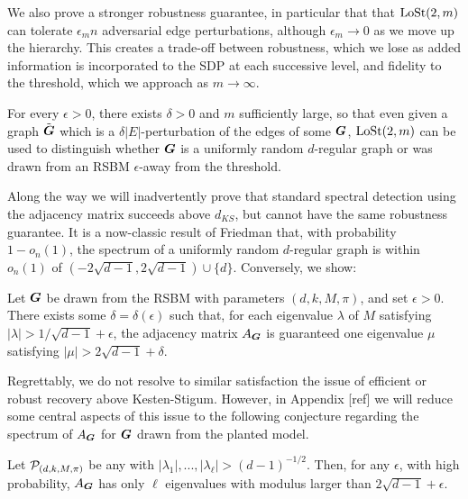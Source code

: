 We also prove a stronger robustness guarantee, in particular that that $\operatorname{LoSt}(2,m)$ can tolerate $\epsilon_m n$ adversarial edge perturbations, although $\epsilon_m \to 0$ as we move up the hierarchy. This creates a trade-off between robustness, which we lose as added information is incorporated to the SDP at each successive level, and fidelity to the threshold, which we approach as $m\to\infty$.

\begin{theorem} \label{thm:main-robust}
	For every $\epsilon > 0$, there exists $\delta > 0$ and $m$ sufficiently large, so that even given a graph $\tilde{\boldsymbol{G}}$ which is a $\delta|E|$-perturbation of the edges of some $\boldsymbol{G}$, $\operatorname{LoSt}(2,m)$ can be used to distinguish whether $\boldsymbol{G}$ is a uniformly random $d$-regular graph or was drawn from an RSBM $\epsilon$-away from the threshold.
\end{theorem}

Along the way we will inadvertently prove that standard spectral detection using the adjacency matrix succeeds above $d_{KS}$, but cannot have the same robustness guarantee. It is a now-classic result of Friedman that, with probability $1 - o_n(1)$, the spectrum of a uniformly random $d$-regular graph is within $o_n(1)$ of $(-2\sqrt{d-1},2\sqrt{d-1})\cup\{d\}$. Conversely, we show:

\begin{corollary} \label{corr:main-robust}
	Let $\boldsymbol{G}$ be drawn from the RSBM with parameters $(d,k,M,\pi)$, and set $\epsilon > 0$. There exists some $\delta = \delta(\epsilon)$ such that, for each eigenvalue $\lambda$ of $M$ satisfying $|\lambda| > 1/\sqrt{d-1} + \epsilon$, the adjacency matrix $A_{\boldsymbol{G}}$  is guaranteed one eigenvalue $\mu$ satisfying $|\mu| > 2\sqrt{d-1} + \delta$.
\end{corollary}

Regrettably, we do not resolve to similar satisfaction the issue of efficient or robust recovery above Kesten-Stigum. However, in Appendix [ref] we will reduce some central aspects of this issue to the following conjecture regarding the spectrum of $A_{\boldsymbol{G}}$ for $\boldsymbol{G}$ drawn from the planted model.

\begin{conjecture} \label{conj:planted-spec}
	Let $\mathcal{P}_{(d,k,M,\pi)}$ be any \model with $|\lambda_1|,...,|\lambda_\ell| > (d-1)^{-1/2}$. Then, for any $\epsilon$, with high probability, $A_{\boldsymbol{G}}$ has only $\ell$ eigenvalues with modulus larger than $2\sqrt{d-1} + \epsilon$.
\end{conjecture}

